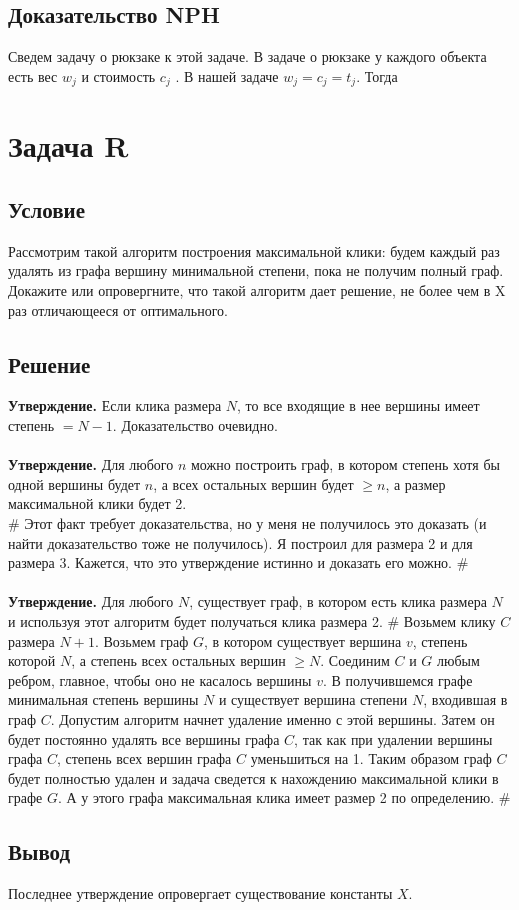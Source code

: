 \documentclass{article}
\begin{document}
\subsection*{Доказательство NPH}
Сведем задачу о рюкзаке к этой задаче. В задаче о рюкзаке у каждого объекта есть вес $w_j$ и стоимость $c_j$ . В нашей задаче $w_j = c_j = t_j$. Тогда 

\newpage
\section*{Задача  R} 

\subsection*{Условие} 
Рассмотрим такой алгоритм построения максимальной клики: будем каждый раз
удалять из графа вершину минимальной степени, пока не получим полный граф.
Докажите или опровергните, что такой алгоритм дает решение, не более чем в X
раз отличающееся от оптимального.

\subsection*{Решение} 
\textbf{Утверждение.} Если клика размера $N$, то все входящие в нее вершины имеет степень $= N - 1$. Доказательство очевидно.
\\
\hfill \\
\textbf{Утверждение.} Для любого $n$ можно построить граф, в котором степень хотя бы одной вершины будет $n$, а всех остальных вершин будет $\geq n$, а размер максимальной клики будет 2. \\
\#
Этот факт требует доказательства, но у меня не получилось это доказать (и найти доказательство тоже не получилось). Я построил для размера 2 и для размера 3. Кажется, что это утверждение истинно и доказать его можно.
\#
\\
\hfill \\
\textbf{Утверждение.} Для любого $N$, существует граф, в котором есть клика размера $N$ и используя этот алгоритм будет получаться клика размера 2. 
\#
Возьмем клику $C$ размера $N + 1$. Возьмем граф $G$, в котором существует вершина $v$, степень которой $N$, а степень всех остальных вершин $\geq N$. Соединим $C$ и $G$ любым ребром, главное, чтобы оно не касалось вершины $v$. В получившемся графе минимальная степень вершины $N$ и существует вершина степени $N$, входившая в граф $C$. Допустим алгоритм начнет удаление именно с этой вершины. Затем он будет постоянно удалять все вершины графа $C$, так как при удалении вершины графа $C$, степень всех вершин графа $C$ уменьшиться на 1. Таким образом граф $C$ будет полностью удален и задача сведется к нахождению максимальной клики в графе $G$. А у этого графа максимальная клика имеет размер 2 по определению.
\#

\subsection*{Вывод} Последнее утверждение опровергает существование константы $X$.
\end{document}
